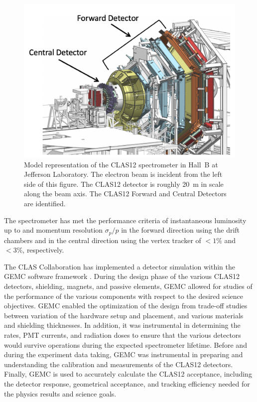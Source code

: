 \begin{figure}
	\centering
	\includegraphics[width=1.0\columnwidth,keepaspectratio]{img/clas12-model.png}
	\caption{ Model representation of the CLAS12 spectrometer in Hall~B at Jefferson Laboratory. The electron
              beam is incident from the left side of this figure. The CLAS12 detector is roughly 20~m in scale along the
              beam axis. The CLAS12 Forward and Central Detectors are identified.}
        \label{fig:clas12-model}
\end{figure}

The spectrometer has met the performance criteria of instantaneous luminosity up
to \cLuminosity and momentum resolution $\sigma_p/p$ in the forward direction using the drift chambers and in the central
direction using the vertex tracker of $< 1\%$ and $< 3\%$, respectively.

The CLAS Collaboration has implemented a detector simulation within the GEMC software framework \cite{GEMC}.
During the design phase of the various CLAS12 detectors, shielding, magnets, and passive elements, GEMC allowed for studies of the
performance of the various components with respect to the desired science objectives.
GEMC enabled the optimization of the design from trade-off studies between variation of the hardware setup and placement,
and various materials and shielding thicknesses.
In addition, it was instrumental in determining the rates, PMT currents, and radiation doses to ensure that the various detectors
would survive operations during the expected spectrometer lifetime.
Before and during the experiment data taking, GEMC was instrumental in preparing and understanding the calibration
and measurements of the CLAS12 detectors.
Finally, GEMC is used to accurately calculate the CLAS12 acceptance, including the detector response, geometrical acceptance,
and tracking efficiency needed for the physics results and science goals.


